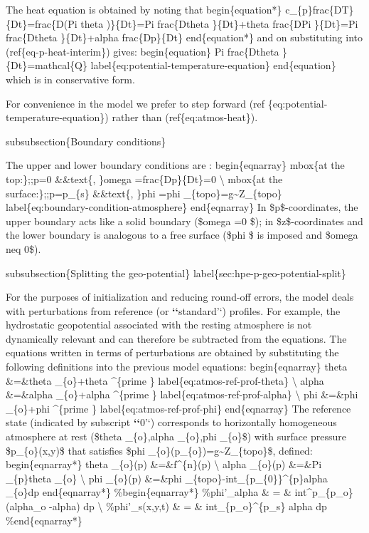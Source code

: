 \documentclass[letterpaper,10pt,english]{sphinxmanual}
\begin{document}
The heat equation is obtained by noting that
begin\{equation*\}
c\_\{p\}frac\{DT\}\{Dt\}=frac\{D(Pi theta )\}\{Dt\}=Pi frac\{Dtheta \}\{Dt\}+theta
frac\{DPi \}\{Dt\}=Pi frac\{Dtheta \}\{Dt\}+alpha frac\{Dp\}\{Dt\}
end\{equation*\}
and on substituting into (ref\{eq-p-heat-interim\}) gives:
begin\{equation\}
Pi frac\{Dtheta \}\{Dt\}=mathcal\{Q\}
label\{eq:potential-temperature-equation\}
end\{equation\}
which is in conservative form.

For convenience in the model we prefer to step forward (ref
\{eq:potential-temperature-equation\}) rather than (ref\{eq:atmos-heat\}).

subsubsection\{Boundary conditions\}

The upper and lower boundary conditions are :
begin\{eqnarray\}
mbox\{at the top:\};;p=0 \&\&text\{, \}omega =frac\{Dp\}\{Dt\}=0 \textbackslash{}
mbox\{at the surface:\};;p=p\_\{s\} \&\&text\{, \}phi =phi \_\{topo\}=g\textasciitilde{}Z\_\{topo\}
label\{eq:boundary-condition-atmosphere\}
end\{eqnarray\}
In \$p\$-coordinates, the upper boundary acts like a solid boundary (\$omega
=0 \$); in \$z\$-coordinates and the lower boundary is analogous to a free
surface (\$phi \$ is imposed and \$omega neq 0\$).

subsubsection\{Splitting the geo-potential\}
label\{sec:hpe-p-geo-potential-split\}

For the purposes of initialization and reducing round-off errors, the model
deals with perturbations from reference (or {\color{red}\bfseries{}{}`{}`}standard'`) profiles. For
example, the hydrostatic geopotential associated with the resting atmosphere
is not dynamically relevant and can therefore be subtracted from the
equations. The equations written in terms of perturbations are obtained by
substituting the following definitions into the previous model equations:
begin\{eqnarray\}
theta \&=\&theta \_\{o\}+theta \textasciicircum{}\{prime \}  label\{eq:atmos-ref-prof-theta\} \textbackslash{}
alpha \&=\&alpha \_\{o\}+alpha \textasciicircum{}\{prime \}  label\{eq:atmos-ref-prof-alpha\} \textbackslash{}
phi \&=\&phi \_\{o\}+phi \textasciicircum{}\{prime \}  label\{eq:atmos-ref-prof-phi\}
end\{eqnarray\}
The reference state (indicated by subscript {\color{red}\bfseries{}{}`{}`}0'`) corresponds to
horizontally homogeneous atmosphere at rest (\$theta \_\{o\},alpha \_\{o\},phi
\_\{o\}\$) with surface pressure \$p\_\{o\}(x,y)\$ that satisfies \$phi
\_\{o\}(p\_\{o\})=g\textasciitilde{}Z\_\{topo\}\$, defined:
begin\{eqnarray*\}
theta \_\{o\}(p) \&=\&f\textasciicircum{}\{n\}(p) \textbackslash{}
alpha \_\{o\}(p) \&=\&Pi \_\{p\}theta \_\{o\} \textbackslash{}
phi \_\{o\}(p) \&=\&phi \_\{topo\}-int\_\{p\_\{0\}\}\textasciicircum{}\{p\}alpha \_\{o\}dp
end\{eqnarray*\}
\%begin\{eqnarray*\}
\%phi'\_alpha \& = \& int\textasciicircum{}p\_\{p\_o\} (alpha\_o -alpha) dp \textbackslash{}
\%phi'\_s(x,y,t) \& = \& int\_\{p\_o\}\textasciicircum{}\{p\_s\} alpha dp
\%end\{eqnarray*\}
\end{document}
